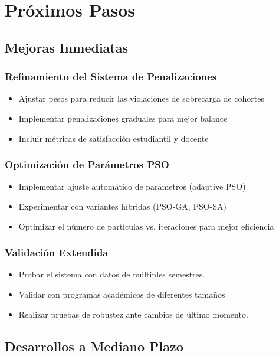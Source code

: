 \section{Próximos Pasos}

\subsection{Mejoras Inmediatas}

\subsubsection{Refinamiento del Sistema de Penalizaciones}
\begin{itemize}
    \item Ajustar pesos para reducir las violaciones de sobrecarga de cohortes
    \item Implementar penalizaciones graduales para mejor balance
    \item Incluir métricas de satisfacción estudiantil y docente
\end{itemize}

\subsubsection{Optimización de Parámetros PSO}
\begin{itemize}
    \item Implementar ajuste automático de parámetros (adaptive PSO)
    \item Experimentar con variantes híbridas (PSO-GA, PSO-SA)
    \item Optimizar el número de partículas vs. iteraciones para mejor eficiencia
\end{itemize}

\subsubsection{Validación Extendida}
\begin{itemize}
    \item Probar el sistema con datos de múltiples semestres.
    \item Validar con programas académicos de diferentes tamaños
    \item Realizar pruebas de robustez ante cambios de último momento.
\end{itemize}

\subsection{Desarrollos a Mediano Plazo}

